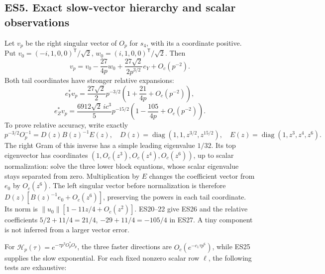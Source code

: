 \documentclass[11pt]{article}
\begin{document}
\subsection{ES5. Exact slow-vector hierarchy and scalar observations}\label{es5.-exact-slow-vector-hierarchy-and-scalar-observations}

Let \(v_p\) be the right singular vector of \(O_p\) for \(s_4\), with its a coordinate positive. Put \(v_0=(-i,1,0,0)^{\mathsf T}/\sqrt2\), \(w_0=(i,1,0,0)^{\mathsf T}/\sqrt2\). Then \[
v_p=v_0-\frac{27}{4p}w_0+\frac{27\sqrt2}{2p^{3/2}}e_Y+O_c(p^{-2}).
\tag{ES26}
\] Both tail coordinates have stronger relative expansions: \[
\boxed{e_Y^*v_p=\frac{27\sqrt2}{2}p^{-3/2}\left(1+\frac{21}{4p}+O_c(p^{-2})\right),}
\] \[
\boxed{e_Z^*v_p=\frac{6912\sqrt2\,ic^3}{5}p^{-15/2}
\left(1-\frac{105}{4p}+O_c(p^{-2})\right).}
\tag{ES27}
\] To prove relative accuracy, write exactly \[
p^{-3/2}O_p^{-1}=D(z)B(z)^{-1}E(z),\quad
D(z)=\operatorname{diag}(1,1,z^{3/2},z^{15/2}),\quad
E(z)=\operatorname{diag}(1,z^3,z^4,z^6).
\] The right Gram of this inverse has a simple leading eigenvalue \(1/32\). Its top eigenvector has coordinates \((1,O_c(z^3),O_c(z^4),O_c(z^6))\), up to scalar normalization: solve the three lower block equations, whose scalar eigenvalue stays separated from zero. Multiplication by \(E\) changes the coefficient vector from \(e_0\) by \(O_c(z^6)\). The left singular vector before normalization is therefore \(D(z)[B(z)^{-1}e_0+O_c(z^6)]\), preserving the powers in each tail coordinate. Its norm is \(\|u_0\|[1-11z/4+O_c(z^2)]\). ES20--22 give ES26 and the relative coefficients \(5/2+11/4=21/4\), \(-29+11/4=-105/4\) in ES27. A tiny component is not inferred from a larger vector error.

For \(\mathcal H_p(\tau)=e^{-\tau p^3O_p^*O_p}\), the three faster directions are \(O_c(e^{-c_1\tau p^6})\), while ES25 supplies the slow exponential. For each fixed nonzero scalar row \(\ell\), the following tests are exhaustive:
\end{document}
